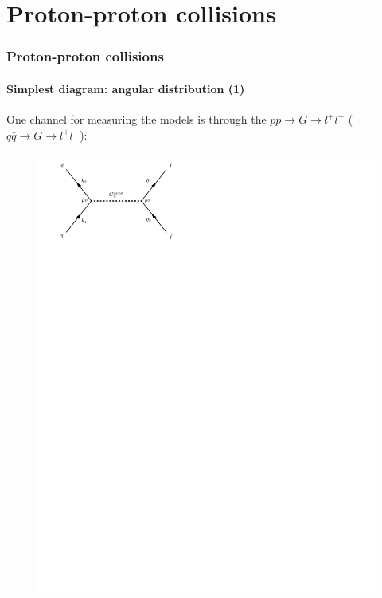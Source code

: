 \documentclass[10pt]{beamer}
\begin{document}
	\section{Proton-proton collisions}
	\begin{frame}
		\frametitle{Proton-proton collisions}
		\framesubtitle{Simplest diagram: angular distribution (1)}
		One channel for measuring the models is through the $pp\rightarrow G\rightarrow l^+l^-$ ($q\bar{q}\rightarrow G\rightarrow l^+l^-$):
		
		\begin{figure}[H]
			\centering
			\includegraphics[trim={0.5cm 22cm 11.5cm 0cm},scale=0.5]{../feynGraphs/qqbar_G_ffbar}
		\end{figure}
		
	\end{frame}
	
\end{document}
